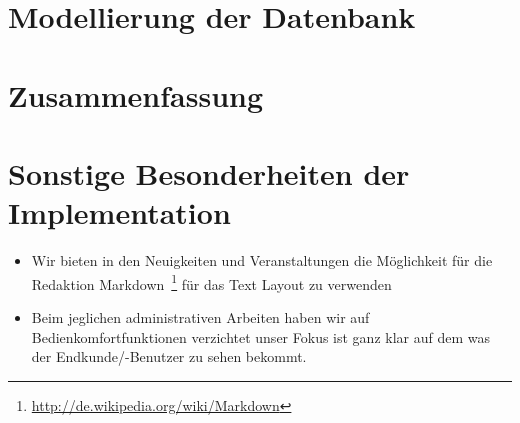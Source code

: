 \documentclass[12pt,a4paper,oneside,ngerman]{article}
\begin{document}
\section{Modellierung der Datenbank} %

\section{Zusammenfassung} %

\section{Sonstige Besonderheiten der Implementation}

\begin{itemize}
	\item Wir bieten in den Neuigkeiten und Veranstaltungen die Möglichkeit für die Redaktion Markdown~\footnote{\url{http://de.wikipedia.org/wiki/Markdown}} für das Text Layout zu verwenden
	\item Beim jeglichen administrativen Arbeiten haben wir auf Bedienkomfortfunktionen verzichtet unser Fokus ist ganz klar auf dem was der Endkunde/-Benutzer zu sehen bekommt.
	
\end{itemize}
\end{document}
